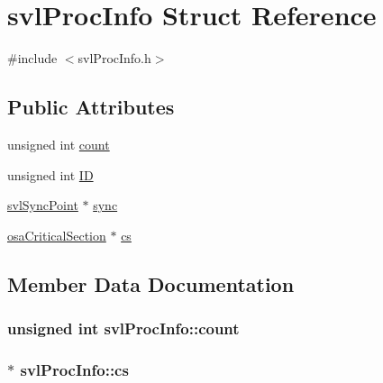 \hypertarget{structsvl_proc_info}{}\section{svl\+Proc\+Info Struct Reference}
\label{structsvl_proc_info}


{\ttfamily \#include $<$svl\+Proc\+Info.\+h$>$}

\subsection*{Public Attributes}
\begin{DoxyCompactItemize}
\item 
unsigned int \hyperlink{structsvl_proc_info_a4cced89ad8330495e631543a5e2b71ad}{count}
\item 
unsigned int \hyperlink{structsvl_proc_info_afc6f44188d8eb0d790d5355880323830}{I\+D}
\item 
\hyperlink{classsvl_sync_point}{svl\+Sync\+Point} $\ast$ \hyperlink{structsvl_proc_info_a43238972bbbf3b4d82e9a28e1c8fd410}{sync}
\item 
\hyperlink{classosa_critical_section}{osa\+Critical\+Section} $\ast$ \hyperlink{structsvl_proc_info_ac899e1383645cebefa007101ecd9b68b}{cs}
\end{DoxyCompactItemize}


\subsection{Member Data Documentation}
\hypertarget{structsvl_proc_info_a4cced89ad8330495e631543a5e2b71ad}{}
\subsubsection[{count}]{\setlength{\rightskip}{0pt plus 5cm}unsigned int svl\+Proc\+Info\+::count}\label{structsvl_proc_info_a4cced89ad8330495e631543a5e2b71ad}
\hypertarget{structsvl_proc_info_ac899e1383645cebefa007101ecd9b68b}{}
\subsubsection[{cs}]{$\ast$ svl\+Proc\+Info\+::cs}\label{structsvl_proc_info_ac899e1383645cebefa007101ecd9b68b}
\hypertarget{structsvl_proc_info_afc6f44188d8eb0d790d5355880323830}{}
